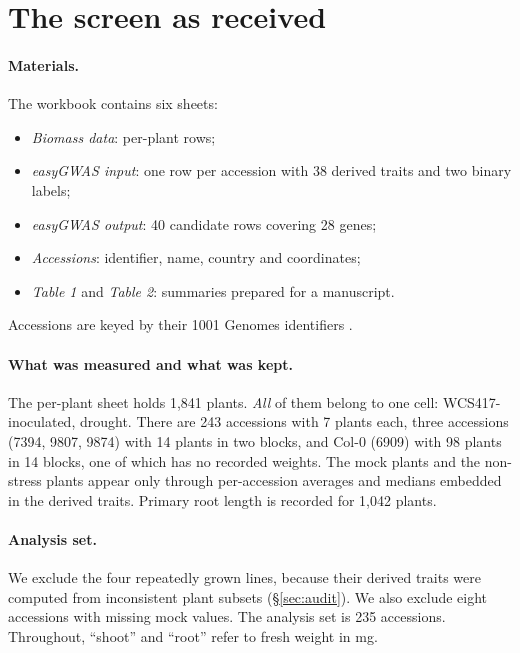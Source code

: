 \documentclass[10pt,twocolumn,a4paper]{article}
\theoremstyle{definition}
\theoremstyle{remark}
\begin{document}
\section{The screen as received}
\label{sec:data}

\paragraph{Materials.} The workbook contains six sheets:
\begin{itemize}[leftmargin=1.3em,itemsep=1pt]
  \item \emph{Biomass data}: per-plant rows;
  \item \emph{easyGWAS input}: one row per accession with 38 derived
  traits and two binary labels;
  \item \emph{easyGWAS output}: 40 candidate rows covering 28 genes;
  \item \emph{Accessions}: identifier, name, country and coordinates;
  \item \emph{Table 1} and \emph{Table 2}: summaries prepared for a
  manuscript.
\end{itemize}
Accessions are keyed by their 1001 Genomes identifiers \citep{genomes2016}.

\paragraph{What was measured and what was kept.}
The per-plant sheet holds 1,841 plants. \emph{All} of them belong to one
cell: WCS417-inoculated, drought. There are 243 accessions with 7 plants
each, three accessions (7394, 9807, 9874) with 14 plants in two blocks,
and Col-0 (6909) with 98 plants in 14 blocks, one of which has no
recorded weights. The mock plants and the non-stress plants appear only
through per-accession averages and medians embedded in the derived
traits. Primary root length is recorded for 1,042 plants.

\paragraph{Analysis set.} We exclude the four repeatedly grown lines,
because their derived traits were computed from inconsistent plant
subsets (\S\ref{sec:audit}). We also exclude eight accessions with
missing mock values. The analysis set is 235 accessions. Throughout,
``shoot'' and ``root'' refer to fresh weight in mg.
\end{document}
